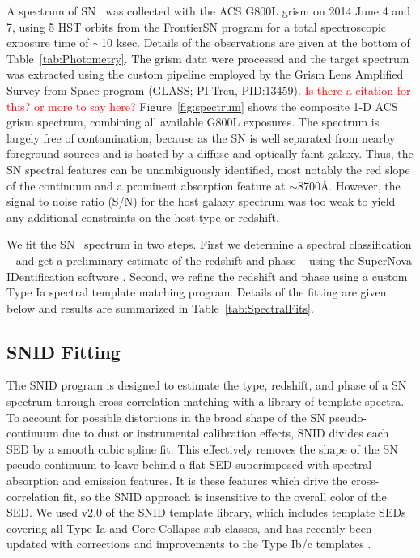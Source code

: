 A spectrum of SN \tomas\ was collected with the ACS G800L grism on
2014 June 4 and 7, using 5 HST orbits from the FrontierSN program for
a total spectroscopic exposure time of $\sim$10 ksec.  Details of the
observations are given at the bottom of
Table~\ref{tab:Photometry}. The grism data were processed and the
target spectrum was extracted using the custom pipeline employed by
the Grism Lens Amplified Survey from Space program (GLASS; PI:Treu,
PID:13459). \textcolor{red}{Is there a citation for this? or more to
say here?}  Figure~\ref{fig:spectrum} shows the composite 1-D ACS
grism spectrum, combining all available G800L exposures.  The spectrum
is largely free of contamination, because as the SN is well separated
from nearby foreground sources and is hosted by a diffuse and
optically faint galaxy.  Thus, the SN spectral features can be
unambiguously identified, most notably the red slope of the continuum
and a prominent absorption feature at $\sim$8700\AA.  However, the
signal to noise ratio (S/N) for the host galaxy spectrum was too weak
to yield any additional constraints on the host type or redshift.  

We fit the SN \tomas\ spectrum in two steps.  First we determine a
spectral classification -- and get a preliminary estimate of the
redshift and phase -- using the SuperNova IDentification
software \citep{Blondin:2010}.  Second, we refine the redshift and
phase using a custom Type Ia spectral template matching
program.  Details of the fitting are given below and results are
summarized in Table~\ref{tab:SpectralFits}.

\subsection{SNID Fitting}
\label{sec:SNID}

The SNID program is designed to estimate the type, redshift, and phase
of a SN spectrum through cross-correlation matching with a library of
template spectra.  To account for possible distortions in the broad
shape of the SN pseudo-continuum due to dust or instrumental
calibration effects, SNID divides each SED by a smooth cubic spline
fit. This effectively removes the shape of the SN pseudo-continuum to
leave behind a flat SED superimposed with spectral absorption and
emission features.  It is these features which drive the
cross-correlation fit, so the SNID approach is insensitive to the
overall color of the SED.  We used v2.0 of the SNID template library,
which includes template SEDs covering all Type Ia and Core Collapse
sub-classes, and has recently been updated with corrections and
improvements to the Type Ib/c templates \citep{Liu:2014}.

